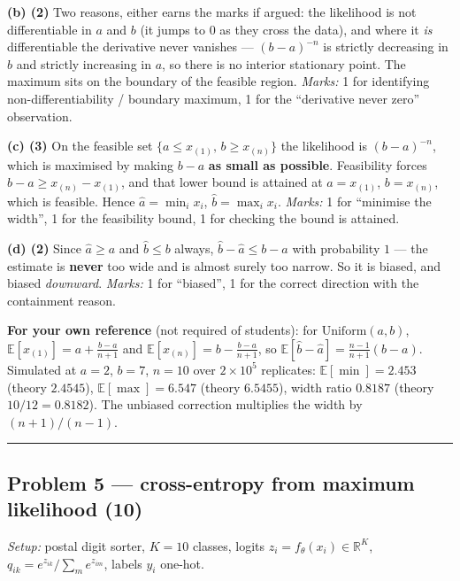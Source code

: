 \documentclass[
  11pt,
  a4paper,
]{article}
\newcommand{\EE}{\mathbb{E}}
\begin{document}
\textbf{(b) (2)} Two reasons, either earns the marks if argued: the
likelihood is not differentiable in \(a\) and \(b\) (it jumps to \(0\)
as they cross the data), and where it \emph{is} differentiable the
derivative never vanishes --- \((b-a)^{-n}\) is strictly decreasing in
\(b\) and strictly increasing in \(a\), so there is no interior
stationary point. The maximum sits on the boundary of the feasible
region. \emph{Marks:} 1 for identifying non-differentiability / boundary
maximum, 1 for the ``derivative never zero'' observation.

\textbf{(c) (3)} On the feasible set
\(\{a \le x_{(1)},\, b \ge x_{(n)}\}\) the likelihood is \((b-a)^{-n}\),
which is maximised by making \(b - a\) \textbf{as small as possible}.
Feasibility forces \(b - a \ge x_{(n)} - x_{(1)}\), and that lower bound
is attained at \(a = x_{(1)}\), \(b = x_{(n)}\), which is feasible.
Hence \(\hat a = \min_i x_i\), \(\hat b = \max_i x_i\). \emph{Marks:} 1
for ``minimise the width'', 1 for the feasibility bound, 1 for checking
the bound is attained.

\textbf{(d) (2)} Since \(\hat a \ge a\) and \(\hat b \le b\) always,
\(\hat b - \hat a \le b-a\) with probability \(1\) --- the estimate is
\textbf{never} too wide and is almost surely too narrow. So it is
biased, and biased \emph{downward}. \emph{Marks:} 1 for ``biased'', 1
for the correct direction with the containment reason.

\textbf{For your own reference} (not required of students): for
\(\mathrm{Uniform}(a,b)\), \(\EE[x_{(1)}] = a + \frac{b-a}{n+1}\) and
\(\EE[x_{(n)}] = b - \frac{b-a}{n+1}\), so
\(\EE[\hat b - \hat a] = \frac{n-1}{n+1}(b-a)\). Simulated at \(a=2\),
\(b=7\), \(n=10\) over \(2\times10^5\) replicates: \(\EE[\min] = 2.453\)
(theory \(2.4545\)), \(\EE[\max] = 6.547\) (theory \(6.5455\)), width
ratio \(0.8187\) (theory \(10/12 = 0.8182\)). The unbiased correction
multiplies the width by \((n+1)/(n-1)\).

\begin{center}\rule{0.5\linewidth}{0.5pt}\end{center}

\subsection{Problem 5 --- cross-entropy from maximum likelihood
(10)}\label{problem-5-cross-entropy-from-maximum-likelihood-10}

\emph{Setup:} postal digit sorter, \(K=10\) classes, logits
\(z_i=f_\theta(x_i)\in\mathbb{R}^K\),
\(q_{ik}=e^{z_{ik}}/\sum_m e^{z_{im}}\), labels \(y_i\) one-hot.
\end{document}
